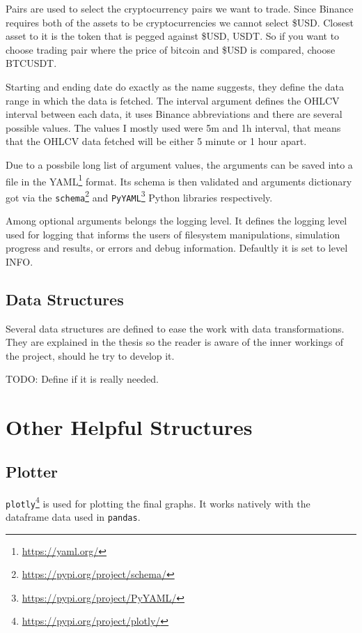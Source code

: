 Pairs are used to select the cryptocurrency pairs we want to trade. Since Binance requires both of the assets to be cryptocurrencies we cannot select \$USD. Closest asset to it is the token that is pegged against \$USD, USDT. So if you want to choose trading pair where the price of bitcoin and \$USD is compared, choose BTCUSDT.

Starting and ending date do exactly as the name suggests, they define the data range in which the data is fetched. The interval argument defines the OHLCV interval between each data, it uses Binance abbreviations and there are several possible values. The values I mostly used were 5m and 1h interval, that means that the OHLCV data fetched will be either 5 minute or 1 hour apart.

Due to a possbile long list of argument values, the arguments can be saved into a file in the YAML\footnote{\url{https://yaml.org/}} format. Its schema is then validated and arguments dictionary got via the \texttt{schema}\footnote{\url{https://pypi.org/project/schema/}} and \texttt{PyYAML}\footnote{\url{https://pypi.org/project/PyYAML/}} Python libraries respectively.

Among optional arguments belongs the logging level. It defines the logging level used for logging that informs the users of filesystem manipulations, simulation progress and results, or errors and debug information. Defaultly it is set to level INFO.

\subsection*{Data Structures}
Several data structures are defined to ease the work with data transformations. They are explained in the thesis so the reader is aware of the inner workings of the project, should he try to develop it.

TODO: Define if it is really needed.

\section{Other Helpful Structures}

\subsection*{Plotter}
\texttt{plotly}\footnote{\url{https://pypi.org/project/plotly/}} is used for plotting the final graphs. It works natively with the dataframe data used in \texttt{pandas}.

